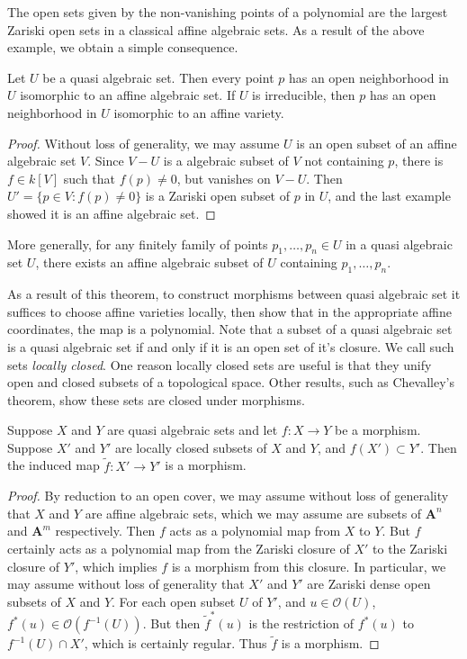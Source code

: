 The open sets given by the non-vanishing points of a polynomial are the largest Zariski open sets in a classical affine algebraic sets. As a result of the above example, we obtain a simple consequence.

\begin{theorem}
    Let $U$ be a quasi algebraic set. Then every point $p$ has an open neighborhood in $U$ isomorphic to an affine algebraic set. If $U$ is irreducible, then $p$ has an open neighborhood in $U$ isomorphic to an affine variety.
\end{theorem}
\begin{proof}
    Without loss of generality, we may assume $U$ is an open subset of an affine algebraic set $V$. Since $V - U$ is a algebraic subset of $V$ not containing $p$, there is $f \in k[V]$ such that $f(p) \neq 0$, but vanishes on $V - U$. Then $U' = \{ p \in V : f(p) \neq 0 \}$ is a Zariski open subset of $p$ in $U$, and the last example showed it is an affine algebraic set.
\end{proof}

\begin{remark}
    More generally, for any finitely family of points $p_1,\dots,p_n \in U$ in a quasi algebraic set $U$, there exists an affine algebraic subset of $U$ containing $p_1,\dots,p_n$.
\end{remark}

As a result of this theorem, to construct morphisms between quasi algebraic set it suffices to choose affine varieties locally, then show that in the appropriate affine coordinates, the map is a polynomial. Note that a subset of a quasi algebraic set is a quasi algebraic set if and only if it is an open set of it's closure. We call such sets \emph{locally closed}. One reason locally closed sets are useful is that they unify open and closed subsets of a topological space. Other results, such as Chevalley's theorem, show these sets are closed under morphisms.

\begin{theorem}
    Suppose $X$ and $Y$ are quasi algebraic sets and let $f: X \to Y$ be a morphism. Suppose $X'$ and $Y'$ are locally closed subsets of $X$ and $Y$, and $f(X') \subset Y'$. Then the induced map $\tilde{f}: X' \to Y'$ is a morphism.
\end{theorem}
\begin{proof}
    By reduction to an open cover, we may assume without loss of generality that $X$ and $Y$ are affine algebraic sets, which we may assume are subsets of $\mathbf{A}^n$ and $\mathbf{A}^m$ respectively. Then $f$ acts as a polynomial map from $X$ to $Y$. But $f$ certainly acts as a polynomial map from the Zariski closure of $X'$ to the Zariski closure of $Y'$, which implies $f$ is a morphism from this closure. In particular, we may assume without loss of generality that $X'$ and $Y'$ are Zariski dense open subsets of $X$ and $Y$. For each open subset $U$ of $Y'$, and $u \in \mathcal{O}(U)$, $f^*(u) \in \mathcal{O}(f^{-1}(U))$. But then $\tilde{f}^*(u)$ is the restriction of $f^*(u)$ to $f^{-1}(U) \cap X'$, which is certainly regular. Thus $\tilde{f}$ is a morphism.
\end{proof}

